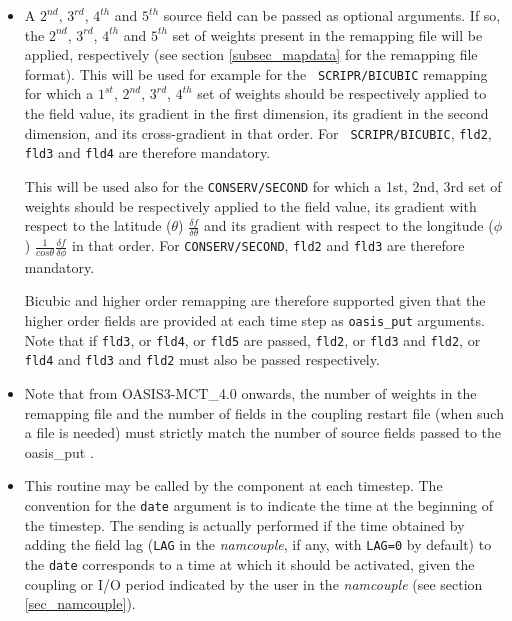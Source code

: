 \begin{itemize}

\item A $2^{nd}$, $3^{rd}$, $4^{th}$ and $5^{th}$ source field can be
  passed as optional arguments. If so, the $2^{nd}$, $3^{rd}$,
  $4^{th}$ and $5^{th}$ set of weights present in the remapping file
  will be applied, respectively (see section \ref{subsec_mapdata} for
  the remapping file format). This will be used for example for the {\tt
    SCRIPR/BICUBIC} remapping for which a $1^{st}$, $2^{nd}$,
  $3^{rd}$, $4^{th}$ set of weights should be respectively applied to
  the field value, its gradient in the first dimension, its gradient
  in the second dimension, and its cross-gradient in that order. For  {\tt
    SCRIPR/BICUBIC},  {\tt fld2}, {\tt fld3} and {\tt fld4} are
  therefore mandatory.

  This will be used also for the {\tt CONSERV/SECOND} for which a 1st, 2nd, 3rd 
  set of weights should be respectively applied to the field value, its 
  gradient with respect to the latitude ($\theta$) $\frac{\delta f}{\delta \theta}$
  and its gradient with respect to the longitude ($\phi$) $\frac{1}{cos \theta}\frac{\delta f}{\delta \phi}$ 
  in that order. For  {\tt CONSERV/SECOND},  {\tt fld2} and {\tt fld3} are
  therefore mandatory.

  Bicubic and higher order
  remapping are therefore supported given that the higher order fields
  are provided at each time step as {\tt oasis\_put} arguments. Note
  that if {\tt fld3}, or {\tt fld4}, or {\tt fld5} are passed, {\tt fld2}, or {\tt fld3} and 
  {\tt fld2}, or {\tt fld4} and {\tt fld3} and {\tt fld2} must also be passed respectively.
  
\item Note that from OASIS3-MCT\_4.0 onwards, 
the number of weights in the remapping file and the number of fields in the coupling restart file 
(when such a file is needed) must strictly match the number of source fields passed to the 
oasis\_put .


\item This routine may be called by the component at each timestep. The
  convention for the {\tt date} argument is to indicate the time at
  the beginning of the timestep. The sending is actually performed
  if the time obtained by adding the field lag ({\tt LAG} in the
  {\em namcouple}, if any, with {\tt LAG=0} by default) to the {\tt date} corresponds to a time at which it
  should be activated, given the coupling or I/O period indicated by
  the user in the {\it namcouple} (see section \ref{sec_namcouple}).


\end{itemize}

